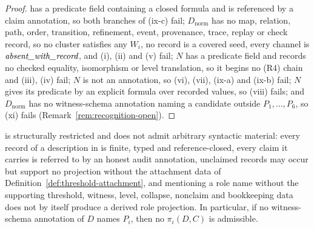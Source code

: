 \begin{proof}
has a predicate field containing a closed formula and is referenced by a claim annotation, so both branches of (ix-c) fail; \(D_{\mathrm{norm}}\) has no map,
relation, path, order, transition, refinement, event, provenance, trace,
replay or check record, so no cluster satisfies any \(W_i\), no record is a
covered seed, every channel is \(\textit{absent\_\allowbreak with\_\allowbreak record}\), and (i), (ii) and (v) fail; \(N\)
has a predicate field and records no checked equality, isomorphism or level
translation, so it begins no (R4) chain and (iii), (iv) fail; \(N\) is not an
annotation, so (vi), (vii), (ix-a) and (ix-b) fail; \(N\) gives its predicate
by an explicit formula over recorded values, so (viii) fails; and
\(D_{\mathrm{norm}}\) has no witness-schema annotation naming a candidate
outside \(P_1,\dots,P_6\), so (xi) fails
(Remark~\ref{rem:recognition-open}).
\end{proof}

\begin{proposition}\label{prop:non-overbreadth}
\FATCD{} is structurally restricted and does not admit arbitrary
syntactic material: every record of a description in \FATCD{} is finite,
typed and reference-closed, every claim it carries is referred to by an honest
audit annotation,
unclaimed records may occur but support no projection without the attachment
data of Definition~\ref{def:threshold-attachment}, and mentioning a role name without the supporting threshold,
witness, level, collapse, nonclaim and bookkeeping data does not by itself produce a
derived role projection. In particular, if no witness-schema annotation of
\(D\) names \(P_i\), then no \(\pi_i(D,C)\) is admissible.
\end{proposition}


